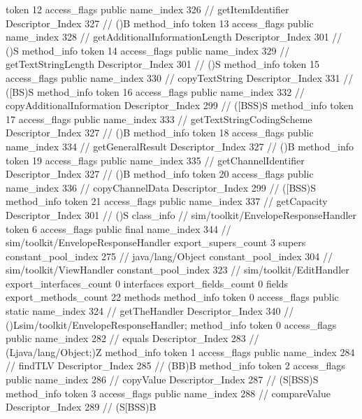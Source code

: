 {{{{{					token	12
					access_flags	public
					name_index	326		// getItemIdentifier
					Descriptor_Index	327		// ()B
				}
				method_info {
					token	13
					access_flags	public
					name_index	328		// getAdditionalInformationLength
					Descriptor_Index	301		// ()S
				}
				method_info {
					token	14
					access_flags	public
					name_index	329		// getTextStringLength
					Descriptor_Index	301		// ()S
				}
				method_info {
					token	15
					access_flags	public
					name_index	330		// copyTextString
					Descriptor_Index	331		// ([BS)S
				}
				method_info {
					token	16
					access_flags	public
					name_index	332		// copyAdditionalInformation
					Descriptor_Index	299		// ([BSS)S
				}
				method_info {
					token	17
					access_flags	public
					name_index	333		// getTextStringCodingScheme
					Descriptor_Index	327		// ()B
				}
				method_info {
					token	18
					access_flags	public
					name_index	334		// getGeneralResult
					Descriptor_Index	327		// ()B
				}
				method_info {
					token	19
					access_flags	public
					name_index	335		// getChannelIdentifier
					Descriptor_Index	327		// ()B
				}
				method_info {
					token	20
					access_flags	public
					name_index	336		// copyChannelData
					Descriptor_Index	299		// ([BSS)S
				}
				method_info {
					token	21
					access_flags	public
					name_index	337		// getCapacity
					Descriptor_Index	301		// ()S
				}
			}
		}
		class_info {		// sim/toolkit/EnvelopeResponseHandler
			token	6
			access_flags	public final
			name_index	344		// sim/toolkit/EnvelopeResponseHandler
			export_supers_count	3
			supers {
				constant_pool_index	275		// java/lang/Object
				constant_pool_index	304		// sim/toolkit/ViewHandler
				constant_pool_index	323		// sim/toolkit/EditHandler
			}
			export_interfaces_count	0
			interfaces {
			}
			export_fields_count	0
			fields {
			}
			export_methods_count	22
			methods {
				method_info {
					token	0
					access_flags	public static
					name_index	324		// getTheHandler
					Descriptor_Index	340		// ()Lsim/toolkit/EnvelopeResponseHandler;
				}
				method_info {
					token	0
					access_flags	public
					name_index	282		// equals
					Descriptor_Index	283		// (Ljava/lang/Object;)Z
				}
				method_info {
					token	1
					access_flags	public
					name_index	284		// findTLV
					Descriptor_Index	285		// (BB)B
				}
				method_info {
					token	2
					access_flags	public
					name_index	286		// copyValue
					Descriptor_Index	287		// (S[BSS)S
				}
				method_info {
					token	3
					access_flags	public
					name_index	288		// compareValue
					Descriptor_Index	289		// (S[BSS)B
}}}}}
